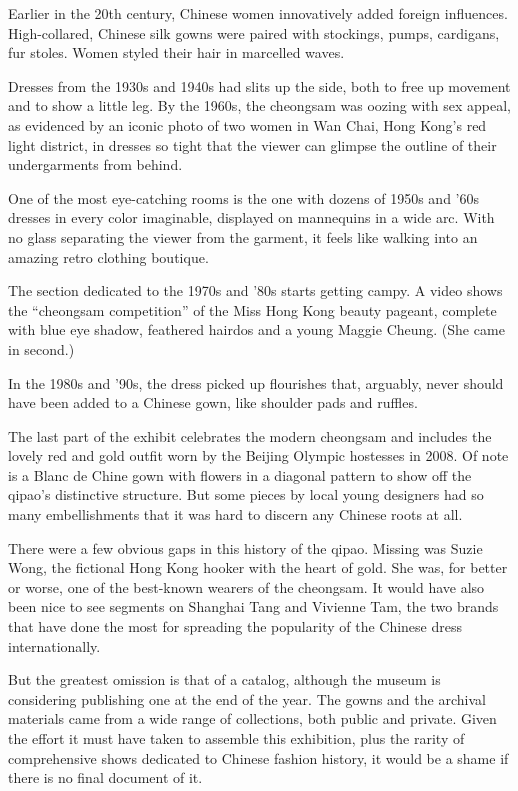 ﻿\documentclass[12pt]{article}
\begin{document}
Earlier in the 20th century, Chinese women innovatively added foreign influences. High-collared,
Chinese silk gowns were paired with stockings, pumps, cardigans, fur stoles. Women styled their hair
in marcelled waves.

Dresses from the 1930s and 1940s had slits up the side, both to free up movement and to show a
little leg. By the 1960s, the cheongsam was oozing with sex appeal, as evidenced by an iconic photo
of two women in Wan Chai, Hong Kong's red light district, in dresses so tight that the viewer can
glimpse the outline of their undergarments from behind.

One of the most eye-catching rooms is the one with dozens of 1950s and '60s dresses in every color
imaginable, displayed on mannequins in a wide arc. With no glass separating the viewer from the
garment, it feels like walking into an amazing retro clothing boutique.

The section dedicated to the 1970s and '80s starts getting campy. A video shows the ``cheongsam
competition'' of the Miss Hong Kong beauty pageant, complete with blue eye shadow, feathered hairdos
and a young Maggie Cheung. (She came in second.)

In the 1980s and '90s, the dress picked up flourishes that, arguably, never should have been added
to a Chinese gown, like shoulder pads and ruffles.

The last part of the exhibit celebrates the modern cheongsam and includes the lovely red and gold
outfit worn by the Beijing Olympic hostesses in 2008. Of note is a Blanc de Chine gown with flowers
in a diagonal pattern to show off the qipao's distinctive structure. But some pieces by local young
designers had so many embellishments that it was hard to discern any Chinese roots at all.

There were a few obvious gaps in this history of the qipao. Missing was Suzie Wong, the fictional
Hong Kong hooker with the heart of gold. She was, for better or worse, one of the best-known wearers
of the cheongsam. It would have also been nice to see segments on Shanghai Tang and Vivienne Tam,
the two brands that have done the most for spreading the popularity of the Chinese dress
internationally.

But the greatest omission is that of a catalog, although the museum is considering publishing one at
the end of the year. The gowns and the archival materials came from a wide range of collections,
both public and private. Given the effort it must have taken to assemble this exhibition, plus the
rarity of comprehensive shows dedicated to Chinese fashion history, it would be a shame if there is
no final document of it.
\end{document}
